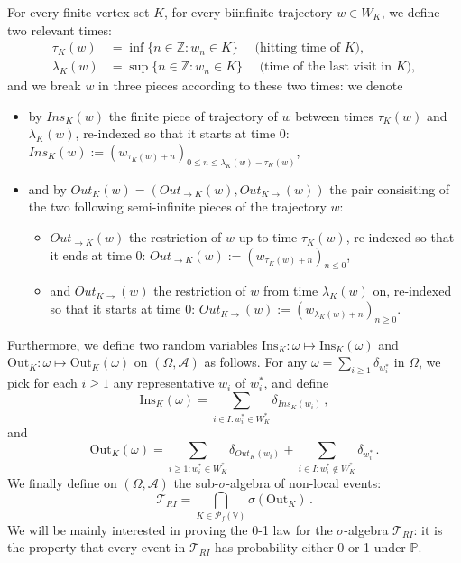 \documentclass[12pt,a4paper]{article}
\newcommand{\1}[1]{{\mathbf 1}{\{#1\}}}
\newcommand{\Z}{{\mathbb Z}}
\newcommand{\bbP}{\mathbb{P}}
\newcommand{\8}{{\infty}}
\newcommand{\Out}{\mathrm{Out}}
\newcommand{\In}{\mathrm{Ins}}
\begin{document}
For every finite vertex set $K$, for every biinfinite trajectory $w\in W_K$, we define two relevant times:
\begin{equation}\label{eq:def_ta_K_lambda_k_w}
\begin{aligned}
\tau_K(w) &  = \inf \{n \in \Z : w_n \in K \} \quad \text{ (hitting time of } K),\\
\lambda_K(w) & = \sup \{n\in \Z : w_n \in K\} \quad  \text{ (time of the last visit in } K),
\end{aligned}
\end{equation}
and we break $w$ in three pieces according to these two times: we denote
\begin{itemize}
  \item by $Ins_K(w)$ the finite piece of trajectory of $w$ between times $\tau_K(w)$ and $\lambda_K(w)$, re-indexed so that it starts at time 0: $Ins_K(w):=(w_{\tau_K(w)+n})_{0\le n \le \lambda_K(w)-\tau_K(w)}$, %
  \item and by $Out_K(w)=(Out_{\rightarrow K}(w) , Out_{K\rightarrow}(w))$ the pair consisiting of the two following semi-infinite pieces of the trajectory $w$:
  \begin{itemize}
  \item $Out_{\rightarrow K}(w)$ the restriction of $w$ up to time $\tau_K(w)$, re-indexed so that it ends at time 0: $Out_{\rightarrow K}(w):=(w_{\tau_K(w)+n})_{n\le 0}$,
  \item and $Out_{K\rightarrow}(w)$ the restriction of $w$ from time $\lambda_K(w)$ on, re-indexed so that it starts at time 0: $Out_{K \rightarrow}(w):=(w_{\lambda_K(w)+n})_{n\ge 0}$.
  \end{itemize} 
\end{itemize}
Furthermore, we define two random variables $\In_K: \omega \mapsto \In_K(\omega)$ and $\Out_K: \omega\mapsto \Out_K(\omega)$ on $(\Omega, \mathcal{A})$ as follows. For any $\omega=\sum_{i\ge 1} \delta_{w_i^*}$ in $\Omega$, we pick for each $i\ge 1$ any representative $w_i$ of $w_i^*$, and define
\begin{equation}
\In_K(\omega)=\sum_{i\in I : w_i^*\in W_K^*} \delta_{Ins_K(w_i)}  \, ,
\end{equation}
and 
\begin{equation}
\Out_K(\omega)=\sum_{i\ge 1: w_i^*\in W_K^*} \delta_{Out_K(w_i)} + \sum_{i\in I : w_i^*\notin W_K^*} \delta_{w_i^*} \, .
\end{equation}
We finally define on $(\Omega, \mathcal{A})$ the sub-$\sigma$-algebra of non-local events:
\begin{equation}
  \mathcal{T}_{RI}= \bigcap_{K \in \mathcal{P}_f(\mathbb{V})} \sigma(\Out_K) \, .
\end{equation}
We will be mainly interested in proving the 0-1 law for the $\sigma$-algebra $\mathcal{T}_{RI}$: it is the property that every event in $\mathcal{T}_{RI}$ has probability either 0 or 1 under $\bbP$. 
\end{document}
